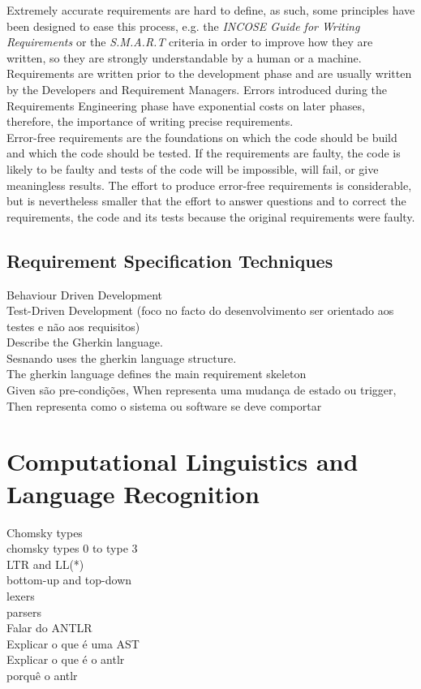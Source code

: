 Extremely accurate requirements are hard to define, as such, some principles have been designed to ease this process, e.g. the \textit{INCOSE Guide for Writing Requirements} \cite{incose} or the \textit{S.M.A.R.T} criteria \cite{mannion_smart_2004} in order to improve how they are written, so they are strongly understandable by a human or a machine.\\
Requirements are written prior to the development phase and are usually written by the Developers and Requirement Managers. Errors introduced during the Requirements Engineering phase have exponential costs on later phases, therefore, the importance of writing precise requirements. \\
Error-free requirements are the foundations on which the code should be build and which the code should be tested. If the requirements are faulty, the code is likely to be faulty and tests of the code will be impossible, will fail, or give meaningless results. The effort to produce error-free requirements is considerable, but is nevertheless smaller that the effort to answer questions and to correct the requirements, the code and its tests because the original requirements were faulty.



\subsection{Requirement Specification Techniques}
\label{subsec:requirement_specification}

Behaviour Driven Development\\
Test-Driven Development (foco no facto do desenvolvimento ser orientado aos testes e não aos requisitos)\\
Describe the Gherkin language.\\
Sesnando uses the gherkin language structure.\\
The gherkin language defines the main requirement skeleton\\
Given são pre-condições, When representa uma mudança de estado ou trigger, Then representa como o sistema ou software se deve comportar\\


\section{Computational Linguistics and Language Recognition}
\label{sec:computational_linguistics}


Chomsky types\\
chomsky types 0 to type 3\\
LTR and LL(*)\\
bottom-up and top-down\\
lexers\\
parsers\\
Falar do ANTLR\\
Explicar o que é uma AST\\
Explicar o que é o antlr\\
porquê o antlr\\


